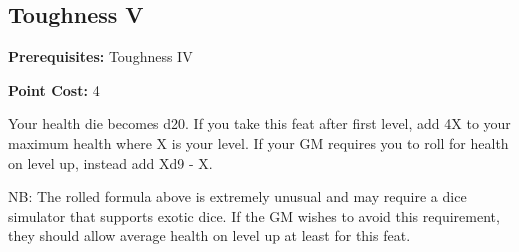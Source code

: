 \subsection{Toughness V}\label{feat:toughness5}

\noindent
\textbf{Prerequisites:} Toughness IV

\noindent
\textbf{Point Cost:} 4 

Your health die becomes d20. If you take this feat after first level, add 4X to
your maximum health where X is your level. If your GM requires you to roll for
health on level up, instead add Xd9 - X.

NB: The rolled formula above is extremely unusual and may require a dice
simulator that supports exotic dice. If the GM wishes to avoid this
requirement, they should allow average health on level up at least for this
feat.

